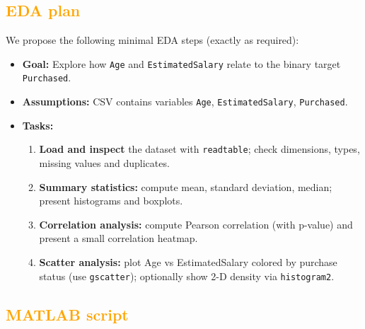 \documentclass[11pt,a4paper]{article}
\begin{document}
\subsection{\textcolor{orange}{EDA plan }}
We propose the following minimal EDA steps (exactly as required):

\begin{itemize}
  \item \textbf{Goal:} Explore how \texttt{Age} and \texttt{EstimatedSalary} relate to the binary target \texttt{Purchased}.
  \item \textbf{Assumptions:} CSV contains variables \texttt{Age}, \texttt{EstimatedSalary}, \texttt{Purchased}.
  \item \textbf{Tasks:}
    \begin{enumerate}
      \item \textbf{Load and inspect} the dataset with \texttt{readtable}; check dimensions, types, missing values and duplicates.
      \item \textbf{Summary statistics:} compute mean, standard deviation, median; present histograms and boxplots.
      \item \textbf{Correlation analysis:} compute Pearson correlation (with p-value) and present a small correlation heatmap.
      \item \textbf{Scatter analysis:} plot Age vs EstimatedSalary colored by purchase status (use \texttt{gscatter}); optionally show 2-D density via \texttt{histogram2}.

    \end{enumerate}
\end{itemize}

\subsection{\textcolor{orange}{MATLAB script }}
\end{document}
